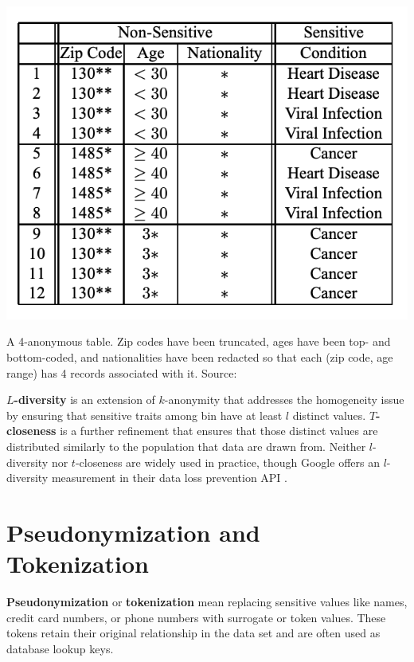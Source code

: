 \documentclass[nobib]{tufte-handout}
\begin{document}
\begin{marginfigure} \includegraphics[width=\linewidth]{kanon}
\caption{A 4-anonymous table. Zip codes have been truncated, ages have been
top- and bottom-coded, and nationalities have been redacted so that each
(zip code, age range) has 4 records associated with it. Source:
\cite{DBLP:conf/icde/MachanavajjhalaGKV06}}
\label{fig:kanon} \end{marginfigure}

\textbf{$L$-diversity} \cite{DBLP:conf/icde/MachanavajjhalaGKV06} is an extension
of $k$-anonymity that addresses the homogeneity issue by ensuring that sensitive
traits among bin have at least $l$ distinct values. \textbf{$T$-closeness}
\cite{DBLP:conf/icde/LiLV07} is a further refinement that ensures that those
distinct values are distributed similarly to the population that data are drawn
from. Neither $l$-diversity nor $t$-closeness are widely used in practice,
though Google offers an $l$-diversity measurement in their data loss prevention
API \cite{google-risk-analysis}.

\section{Pseudonymization and Tokenization}

\textbf{Pseudonymization} or \textbf{tokenization} mean replacing sensitive
values like names, credit card numbers, or phone numbers with surrogate or token
values. These tokens retain their original relationship in the data set and are
often used as database lookup keys.
\end{document}
